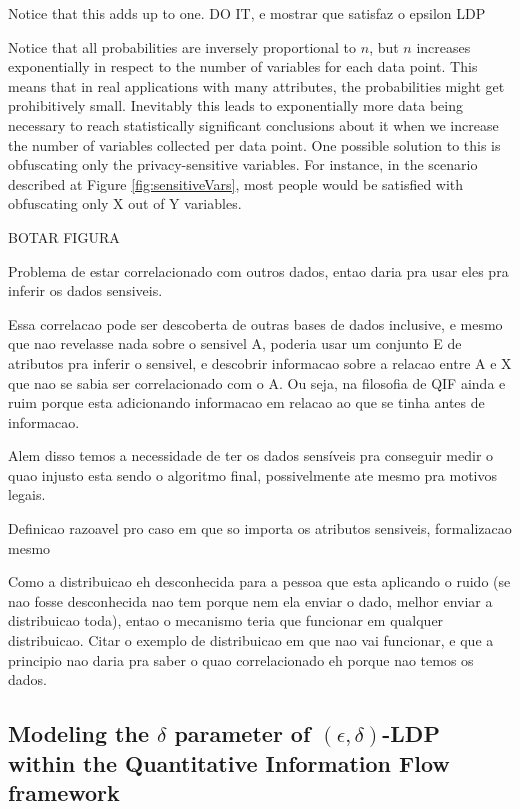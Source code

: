 \documentclass[conference]{IEEEtran}
\begin{document}
Notice that this adds up to one. {\color{red} DO IT, e mostrar que satisfaz o epsilon LDP}

Notice that all probabilities are inversely proportional to $n$, but $n$ increases exponentially in respect to the number of variables for each data point. This means that in real applications with many attributes, the probabilities might get prohibitively small. Inevitably this leads to exponentially more data being necessary to reach statistically significant conclusions about it when we increase the number of variables collected per data point. One possible solution to this is obfuscating only the privacy-sensitive variables. For instance, in the scenario described at Figure \ref{fig:sensitiveVars}, most people would be satisfied with obfuscating only {\color{red} X} out of {\color{red} Y} variables.

{\color{red} BOTAR FIGURA}

{\color{red} Problema de estar correlacionado com outros dados, entao daria pra usar eles pra inferir os dados sensiveis.}

{\color{red} Essa correlacao pode ser descoberta de outras bases de dados inclusive, e mesmo que nao revelasse nada sobre o sensivel A, poderia usar um conjunto E de atributos pra inferir o sensivel, e descobrir informacao sobre a relacao entre A e X que nao se sabia ser correlacionado com o A. Ou seja, na filosofia de QIF ainda e ruim porque esta adicionando informacao em relacao ao que se tinha antes de informacao.}

{\color{red} Alem disso temos a necessidade de ter os dados sensíveis pra conseguir medir o quao injusto esta sendo o algoritmo final, possivelmente ate mesmo pra motivos legais.}

{\color{red} Definicao razoavel pro caso em que so importa os atributos sensiveis, formalizacao mesmo}

{\color{red} Como a distribuicao eh desconhecida para a pessoa que esta aplicando o ruido (se nao fosse desconhecida nao tem porque nem ela enviar o dado, melhor enviar a distribuicao toda), entao o mecanismo teria que funcionar em qualquer distribuicao. Citar o exemplo de distribuicao em que nao vai funcionar, e que a principio nao daria pra saber o quao correlacionado eh porque nao temos os dados.}

\subsection{Modeling the $\delta$ parameter of $(\epsilon,\delta)$-LDP within the Quantitative Information Flow framework}\label{subsec:ldeltap}
\end{document}
